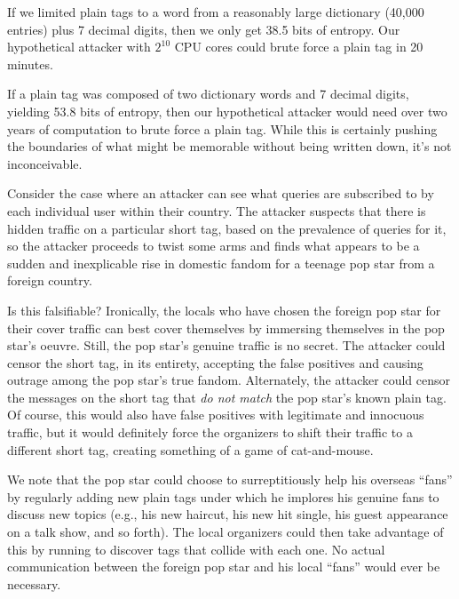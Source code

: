 If we limited plain tags to a word from a reasonably large dictionary (40,000
entries) plus 7 decimal digits, then we only get 38.5 bits of
entropy.  Our hypothetical attacker with $2^{10}$ CPU cores could
brute force a plain tag in 20 minutes.

If a plain tag was composed of two dictionary words and 7 decimal
digits, yielding 53.8 bits of entropy, then our hypothetical attacker would need 
over two years of computation to brute force a plain tag. While this
is certainly pushing the boundaries of what might be memorable without
being written down, it's not inconceivable.


%
Consider the case where an attacker can see what queries are
subscribed to by each individual user within their country. The
attacker suspects that there is hidden traffic on a particular short
tag, based on the prevalence of queries for it, so the attacker
proceeds to twist some arms and finds what appears to be a
sudden and inexplicable rise in domestic fandom for a teenage pop star
from a foreign country.

Is this falsifiable? Ironically, the locals who have chosen the
foreign pop star for their cover traffic can best cover themselves by
immersing themselves in the pop star's oeuvre. Still, the pop star's
genuine traffic is no secret. The attacker could censor the short tag,
in its entirety, accepting the false positives and causing outrage
among the pop star's true fandom. Alternately, the
attacker could censor the \hoot messages on the short tag that {\em do
not match} the pop star's known plain tag. Of course, this would also
have false positives with legitimate and innocuous traffic, but it
would definitely force the organizers to shift their traffic to a
different short tag, creating something of a game of cat-and-mouse.

We note that the pop star could choose to surreptitiously help his
overseas ``fans'' by regularly adding new plain tags under which he
implores his genuine fans to discuss new topics (e.g., his new
haircut, his new hit single, his guest appearance on a talk show, and
so forth). The local organizers could then take advantage of this by
running  to discover tags that collide with each
one. No actual communication between the foreign pop star and his
local ``fans'' would ever be necessary.


